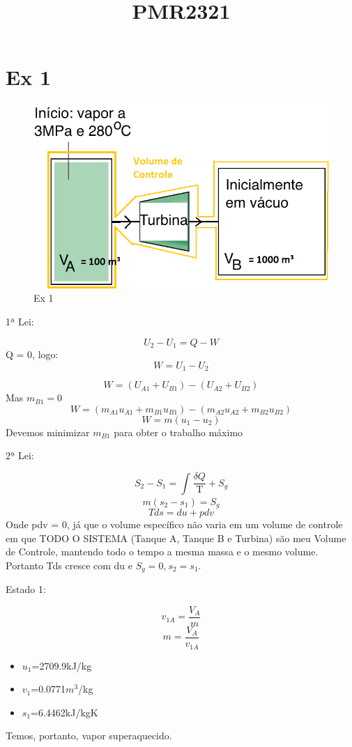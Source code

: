 \documentclass[a4paper, 12pt]{article}
\title{PMR2321}
\begin{document}
\maketitle

\section{Ex 1}

\begin{figure}[h]
\begin{center}
\includegraphics[scale=0.54]{./fig/1.png}
\caption{\label{fig:1} Ex 1} 
\end{center}
\end{figure}

1ª Lei:

\[U_{2}-U_{1}= Q - W \]
Q = 0, logo:
\[W = U_{1}-U_{2}\]

\[W = (U_{A1}+U_{B1})-(U_{A2}+U_{B2})\]
Mas $m_{B1}=0$
\[W = (m_{A1}u_{A1}+m_{B1}u_{B1})-(m_{A2}u_{A2}+m_{B2}u_{B2})\]
\[W=m(u_{1}-u_{2})\]
Devemos minimizar $m_{B1}$ para obter o trabalho máximo

2ª Lei:

\[S_{2}-S_{1}= \int_{}^{} \frac{\delta Q}{\text{T}} + S_{g}\]
\[m(s_{2}-s_{1})=S_{g}\]
\[Tds=du+pdv\]
Onde pdv = 0, já que o volume específico não varia em um volume de controle em que TODO O SISTEMA (Tanque A, Tanque B e Turbina) são meu Volume de Controle, mantendo todo o tempo a mesma massa e o mesmo volume. Portanto Tds cresce com du e $S_{g}=0$,$\ s_{2}=s_{1}$.

Estado 1:

\[v_{1A}= \frac{V_{A}}{m}\]
\[m=\frac{V_{A}}{v_{1A}}\]
\begin{itemize}
\item $u_{1}$=2709.9kJ/kg
\item $v_{1}$=0.0771$m^{3}$/kg
\item $s_{1}$=6.4462kJ/kgK
\end{itemize}
Temos, portanto, vapor superaquecido.
\end{document}
